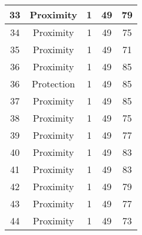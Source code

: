 \documentclass[results.tex]{subfiles}
\begin{document}
\begin{center}
\begin{tabular}{| c || c | c | c | c |}
            \hline
            33                      & Proximity                    & 1                      & 49                      & 79                   \\
            \hline
            34                      & Proximity                    & 1                      & 49                      & 75                   \\
            \hline
            35                      & Proximity                    & 1                      & 49                      & 71                   \\
            \hline
            36                      & Proximity                    & 1                      & 49                      & 85                   \\
            \hline
            36                      & Protection                   & 1                      & 49                      & 85                   \\
            \hline
            37                      & Proximity                    & 1                      & 49                      & 85                   \\
            \hline
            38                      & Proximity                    & 1                      & 49                      & 75                   \\
            \hline
            39                      & Proximity                    & 1                      & 49                      & 77                   \\
            \hline
            40                      & Proximity                    & 1                      & 49                      & 83                   \\
            \hline
            41                      & Proximity                    & 1                      & 49                      & 83                   \\
            \hline
            42                      & Proximity                    & 1                      & 49                      & 79                   \\
            \hline
            43                      & Proximity                    & 1                      & 49                      & 77                   \\
            \hline
            44                      & Proximity                    & 1                      & 49                      & 73                   \\

\end{tabular}
\end{center}
\end{document}
